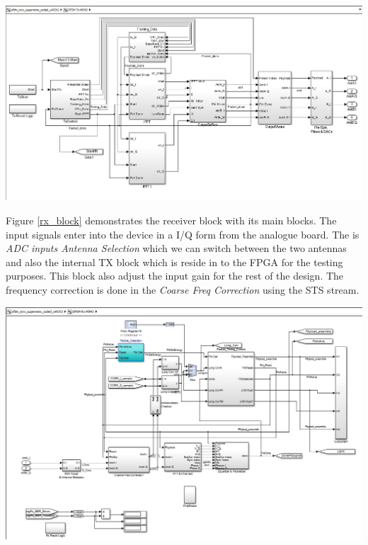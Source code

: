 \begin{center}
\includegraphics[width=\textwidth]{content/fig/txblock.JPG}
\label{tx_block}
\end{center}

Figure \ref{rx_block} demonstrates the receiver block with its main blocks. The input signals enter into the device in a I/Q form from the analogue board. The is \textit{ADC inputs Antenna Selection} which we can switch between the two antennas and also the internal TX block which is reside in to the FPGA for the testing purposes. This block also adjust the input gain for the rest of the design. The frequency correction is done in the \textit{Coarse Freq Correction} using the STS stream.  
\begin{center}
\includegraphics[width=\textwidth]{content/fig/rxblock.JPG}
\label{rx_block}
\end{center}

